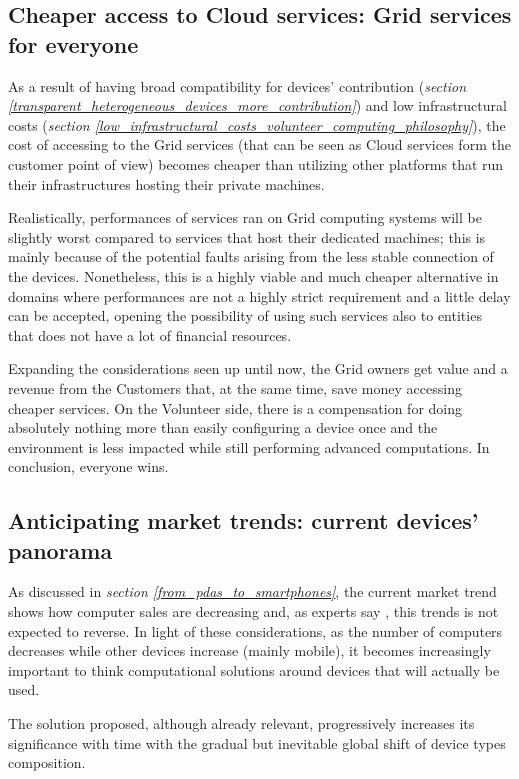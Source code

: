 \subsection{Cheaper access to Cloud services: Grid services for everyone}\label{cheaper_access_to_cloud_services}
As a result of having broad compatibility for devices' contribution (\textit{section \ref{transparent_heterogeneous_devices_more_contribution}}) and low infrastructural costs (\textit{section \ref{low_infrastructural_costs_volunteer_computing_philosophy}}), the cost of accessing to the Grid services (that can be seen as Cloud services form the customer point of view) becomes cheaper than utilizing other platforms that run their infrastructures hosting their private machines.

Realistically, performances of services ran on Grid computing systems will be slightly worst compared to services that host their dedicated machines; this is mainly because of the potential faults arising from the less stable connection of the devices. Nonetheless, this is a highly viable and much cheaper alternative in domains where performances are not a highly strict requirement and a little delay can be accepted, opening the possibility of using such services also to entities that does not have a lot of financial resources.

Expanding the considerations seen up until now, the Grid owners get value and a revenue from the Customers that, at the same time, save money accessing cheaper services. On the Volunteer side, there is a compensation for doing absolutely nothing more than easily configuring a device once and the environment is less impacted while still performing advanced computations. In conclusion, everyone wins. 

\subsection{Anticipating market trends: current devices' panorama}
As discussed in \textit{section \ref{from_pdas_to_smartphones}}, the current market trend shows how computer sales are decreasing and, as experts say \cite{smartphones_sales}, this trends is not expected to reverse. In light of these considerations, as the number of computers decreases while other devices increase (mainly mobile), it becomes increasingly important to think computational solutions around devices that will actually be used.

The solution proposed, although already relevant, progressively increases its significance with time with the gradual but inevitable global shift of device types composition.